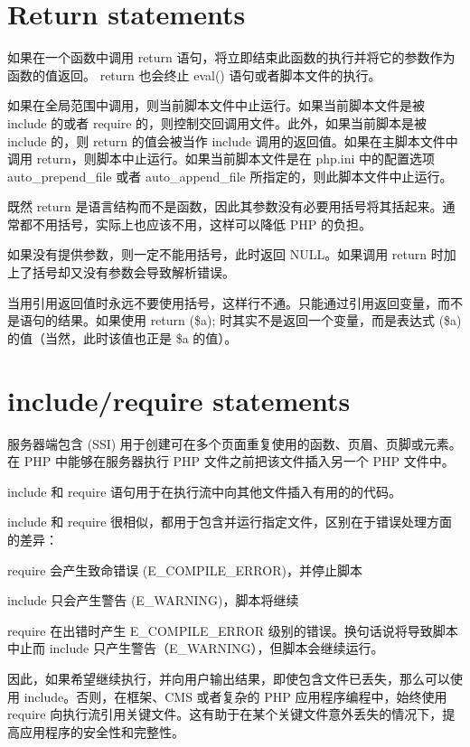 \section{Return statements}

如果在一个函数中调用 return 语句，将立即结束此函数的执行并将它的参数作为函数的值返回。 return 也会终止 eval() 语句或者脚本文件的执行。

如果在全局范围中调用，则当前脚本文件中止运行。如果当前脚本文件是被 include 的或者 require 的，则控制交回调用文件。此外，如果当前脚本是被 include 的，则 return 的值会被当作 include 调用的返回值。如果在主脚本文件中调用 return，则脚本中止运行。如果当前脚本文件是在 php.ini 中的配置选项 auto\_prepend\_file 或者 auto\_append\_file 所指定的，则此脚本文件中止运行。

既然 return 是语言结构而不是函数，因此其参数没有必要用括号将其括起来。通常都不用括号，实际上也应该不用，这样可以降低 PHP 的负担。

如果没有提供参数，则一定不能用括号，此时返回 NULL。如果调用 return 时加上了括号却又没有参数会导致解析错误。

当用引用返回值时永远不要使用括号，这样行不通。只能通过引用返回变量，而不是语句的结果。如果使用 return (\$a); 时其实不是返回一个变量，而是表达式 (\$a) 的值（当然，此时该值也正是 \$a 的值）。



\section{include/require statements}

服务器端包含 (SSI) 用于创建可在多个页面重复使用的函数、页眉、页脚或元素。在 PHP 中能够在服务器执行 PHP 文件之前把该文件插入另一个 PHP 文件中。

include 和 require 语句用于在执行流中向其他文件插入有用的的代码。

include 和 require 很相似，都用于包含并运行指定文件，区别在于错误处理方面的差异：

\begin{compactitem}
\item require 会产生致命错误 (E\_COMPILE\_ERROR)，并停止脚本
\item include 只会产生警告 (E\_WARNING)，脚本将继续
\end{compactitem}

require 在出错时产生 E\_COMPILE\_ERROR 级别的错误。换句话说将导致脚本中止而 include 只产生警告（E\_WARNING），但脚本会继续运行。

因此，如果希望继续执行，并向用户输出结果，即使包含文件已丢失，那么可以使用 include。否则，在框架、CMS 或者复杂的 PHP 应用程序编程中，始终使用 require 向执行流引用关键文件。这有助于在某个关键文件意外丢失的情况下，提高应用程序的安全性和完整性。

